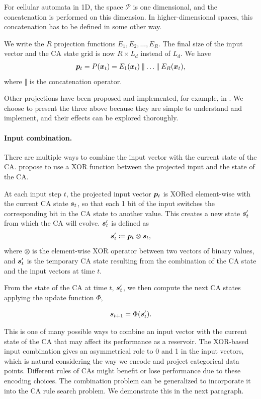 For cellular automata in 1D, the space $\mathcal{P}$ is one dimensional, and the
concatenation is performed on this dimension. In higher-dimensional spaces,
this concatenation has to be defined in some other way.

We write the $R$ projection functions $E_{1}, E_{2}, \ldots, E_{R}$. The final size
of the input vector and the CA state grid is now $R \times L_{d}$ instead of $L_{d}$.
We have
\begin{align}
  {\bm{p}}_{t} = P({\bm{x}}_{t}) = E_{1}({\bm{x}}_{t})\mathbin\Vert \ldots \mathbin \Vert E_{R}({\bm{x}}_{t}),
\end{align}
where $\mathbin\Vert$ is the concatenation operator.

Other projections have been proposed and implemented, for example, in
\parencite{yilmazReservoirComputingUsing2014}. We choose to present the three
above because they are simple to understand and implement, and their effects can
be explored thoroughly.

\paragraph{Input combination.}
There are multiple ways to combine the input vector with the current state of the \ac{CA}. \textcite{gloverDynamicalLandscapeReservoir2021} propose to use a XOR
function between the projected input and the state of the \ac{CA}.

At each input step $t$, the projected input vector ${\bm{p}}_{t}$ is XORed
element-wise with the current CA state ${\bm{s}}_{t}$, so that each 1 bit of the
input switches the corresponding bit in the CA state to another value. This
creates a new state ${\bm{s}}_{t}'$ from which the CA will evolve. ${\bm{s}}_{t}'$ is
defined as
\begin{align}
  {\bm{s}}_{t}' \coloneqq {\bm{p}}_{t} \otimes {\bm{s}}_{t},
\end{align}
where $\otimes$ is the element-wise XOR operator between two vectors of binary
values, and ${\bm{s}}'_{t}$ is the temporary CA state resulting from the combination
of the CA state and the input vectors at time $t$.

From the state of the \ac{CA} at time $t$, ${\bm{s}}'_{t}$, we then compute the next CA states
applying the update function $\Phi$,

\begin{equation}
  \label{eq:ca-state}
  {\bm{s}}_{t + 1} = \Phi({\bm{s}}'_{t}).
\end{equation}

This is one of many possible ways to combine an input vector with the current
state of the CA that may affect its performance as a reservoir. The XOR-based
input combination gives an asymmetrical role to 0 and 1 in the input vectors, which
is natural considering the way we encode and project categorical data
points. Different rules of \acp{CA} might benefit or lose performance due to these encoding choices. The combination problem can be generalized to
incorporate it into the \ac{CA} rule search problem. We demonstrate this in the
next paragraph.

